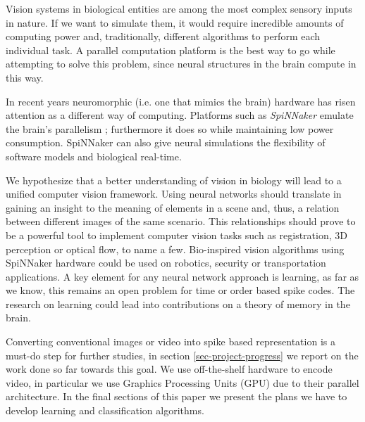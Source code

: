 Vision systems in biological entities are among the most complex sensory
inputs in nature. If we want to simulate them, it would require incredible
amounts of computing power and, traditionally, different algorithms to perform
each individual task. A parallel computation platform is the best way to go
while attempting to solve this problem, since neural structures in the brain 
compute in this way. 

In recent years neuromorphic (i.e. one that mimics the brain) hardware has
risen attention as a different way of computing. Platforms such as
\emph{SpiNNaker} emulate the brain's parallelism \cite{furber2013overview}; furthermore it does so while maintaining low power consumption. SpiNNaker 
can also give neural simulations the flexibility of software models
and biological real-time.

We hypothesize that a better understanding of vision in biology will lead to 
a unified computer vision framework. Using neural networks should translate in 
gaining an insight to the meaning of elements in a scene and, thus, a relation
between different images of the same scenario. This relationships should prove
to be a powerful tool to implement computer vision tasks such as registration, 
3D perception or optical flow, to name a few. Bio-inspired vision algorithms 
using SpiNNaker hardware could be used on robotics, security or transportation 
applications. A key element for any neural network approach is learning, as far
as we know, this remains an open problem for time or order based spike codes. 
The research on learning could lead into contributions on a theory of memory in 
the brain.

Converting conventional images or video into spike based representation is a
must-do step for further studies, in section \ref{sec-project-progress} we
report on the work done so far towards this goal. We use off-the-shelf hardware
to encode video, in particular we use Graphics Processing Units (GPU) due to 
their parallel architecture. In the final sections of this paper we present the plans we have to develop learning and classification algorithms.
